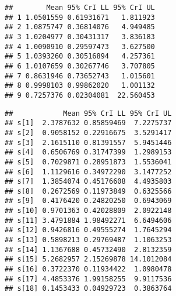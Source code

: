 \documentclass[]{article}
\newenvironment{Shaded}{\begin{snugshade}}{\end{snugshade}}
\newcommand{\CommentTok}[1]{\textcolor[rgb]{0.56,0.35,0.01}{\textit{#1}}}
\newcommand{\ControlFlowTok}[1]{\textcolor[rgb]{0.13,0.29,0.53}{\textbf{#1}}}
\newcommand{\DataTypeTok}[1]{\textcolor[rgb]{0.13,0.29,0.53}{#1}}
\newcommand{\DecValTok}[1]{\textcolor[rgb]{0.00,0.00,0.81}{#1}}
\newcommand{\FloatTok}[1]{\textcolor[rgb]{0.00,0.00,0.81}{#1}}
\newcommand{\KeywordTok}[1]{\textcolor[rgb]{0.13,0.29,0.53}{\textbf{#1}}}
\newcommand{\NormalTok}[1]{#1}
\newcommand{\OperatorTok}[1]{\textcolor[rgb]{0.81,0.36,0.00}{\textbf{#1}}}
\newcommand{\StringTok}[1]{\textcolor[rgb]{0.31,0.60,0.02}{#1}}
\begin{document}
\begin{verbatim}
##        Mean 95% CrI LL 95% CrI UL
## 1 1.0501559 0.61931671   1.811923
## 2 1.0875747 0.36814076   4.949485
## 3 1.0204977 0.30431317   3.836183
## 4 1.0090910 0.29597473   3.627500
## 5 1.0393260 0.30516894   4.257361
## 6 1.0107659 0.30267746   3.707805
## 7 0.8631946 0.73652743   1.015601
## 8 0.9998103 0.99862020   1.001132
## 9 0.7257376 0.02304081  22.560453
\end{verbatim}

\begin{Shaded}
\end{Shaded}

\begin{verbatim}
##            Mean 95% CrI LL 95% CrI UL
## s[1]  2.3787632 0.85859469  7.2275737
## s[2]  0.9058152 0.22916675  3.5291417
## s[3]  2.1615110 0.81391557  5.9451446
## s[4]  0.6506769 0.31747399  1.2989153
## s[5]  0.7029871 0.28951873  1.5536041
## s[6]  1.1129616 0.34972290  3.1477252
## s[7]  1.3854074 0.45176608  4.4935803
## s[8]  0.2672569 0.11973849  0.6325566
## s[9]  0.4176420 0.24820250  0.6943069
## s[10] 0.9701363 0.42028809  2.0922148
## s[11] 3.4791884 1.98492271  6.6494606
## s[12] 0.9426816 0.49555274  1.7645294
## s[13] 0.5898213 0.29769487  1.1063253
## s[14] 1.1367688 0.45732490  2.8132359
## s[15] 5.2682957 2.15269878 14.1012084
## s[16] 0.3722370 0.11934422  1.0980478
## s[17] 4.4853376 1.99158255  9.9117536
## s[18] 0.1453433 0.04929723  0.3863764
\end{verbatim}
\end{document}
